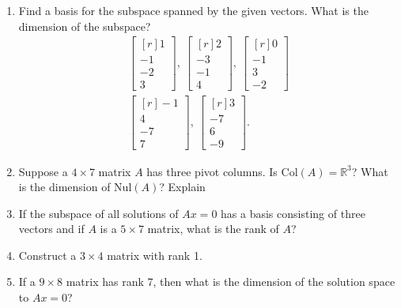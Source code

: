 \documentclass[12pt]{article}
\begin{document}
\begin{multicols*}{2}
\begin{enumerate}
		\item Find a basis for the subspace spanned by the given vectors. What is the dimension of the subspace?
		\begin{gather*}
			\begin{bmatrix*}[r]
				1\\-1\\-2\\3
			\end{bmatrix*},\ \begin{bmatrix*}[r]
				2\\-3\\-1\\4
			\end{bmatrix*},\ \begin{bmatrix*}[r]
				0\\-1\\3\\-2
			\end{bmatrix*}\\
			\begin{bmatrix*}[r]
				-1\\4\\-7\\7
			\end{bmatrix*},\ \begin{bmatrix*}[r]
				3\\-7\\6\\-9
			\end{bmatrix*}.
		\end{gather*}
		\vfill\null\columnbreak

		\item Suppose a $4\times 7$ matrix $A$ has three pivot columns. Is Col$(A) = \mathbb{R}^3$? What is the dimension of Nul$(A)$? Explain
		\vfill

		\item If the subspace of all solutions of $Ax=0$ has a basis consisting of three vectors and if $A$ is a $5\times 7$ matrix, what is the rank of $A$?

		\vfill

		\item Construct a $3\times 4$ matrix with rank 1.

		\vfill

		\item If a $9\times 8$ matrix has rank 7, then what is the dimension of the solution space to $Ax=0$?

		\vfill\null\pagebreak


\end{enumerate}
\end{multicols*}
\end{document}
